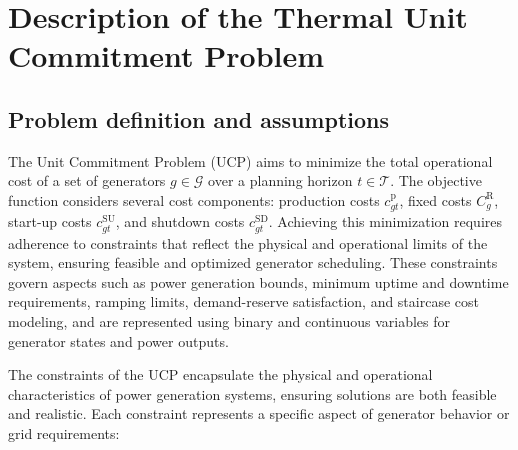 \section{Description of the Thermal Unit Commitment Problem}
\label{sec:Mathematicalmodel}


\subsection{Problem definition and assumptions}


The Unit Commitment Problem (UCP) aims to minimize the total operational cost of a set of generators $g \in \mathcal{G}$ over a planning horizon $t \in \mathcal{T}$. The objective function considers several cost components: production costs $c_{gt}^{\text{p}}$, fixed costs $C_g^{\text{R}}$, start-up costs $c_{gt}^{\text{SU}}$, and shutdown costs $c_{gt}^{\text{SD}}$. Achieving this minimization requires adherence to constraints that reflect the physical and operational limits of the system, ensuring feasible and optimized generator scheduling. These constraints govern aspects such as power generation bounds, minimum uptime and downtime requirements, ramping limits, demand-reserve satisfaction, and staircase cost modeling, and are represented using binary and continuous variables for generator states and power outputs.

The constraints of the UCP encapsulate the physical and operational characteristics of power generation systems, ensuring solutions are both feasible and realistic. Each constraint represents a specific aspect of generator behavior or grid requirements:

